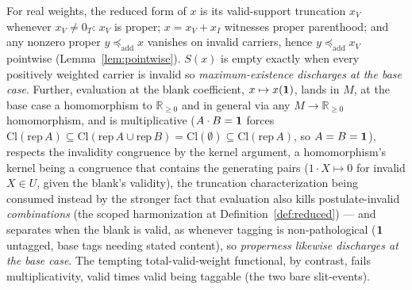 \begin{lemma}[The base case $M = \mathbb{R}_{\geq 0}$]\label{lem:basecase}
For real weights, the reduced form of $x$ is its valid-support truncation $x_V$ whenever $x_V \neq 0_T$: $x_V$ is proper; $x = x_V + x_I$ witnesses proper parenthood; and any nonzero proper $y \preceq_{\mathrm{add}} x$ vanishes on invalid carriers, hence $y \preceq_{\mathrm{add}} x_V$ pointwise (Lemma~\ref{lem:pointwise}). $S(x)$ is empty exactly when every positively weighted carrier is invalid  so \emph{maximum-existence discharges at the base case}. Further, evaluation at the blank coefficient, $x \mapsto x(\mathbf{1})$, lands in $M$, at the base case a homomorphism to $\mathbb{R}_{\geq 0}$ and in general via any $M \to \mathbb{R}_{\geq 0}$ homomorphism, and is multiplicative ($A \cdot B = \mathbf{1}$ forces $\mathrm{Cl}(\mathrm{rep}\,A) \subseteq \mathrm{Cl}(\mathrm{rep}\,A \cup \mathrm{rep}\,B) = \mathrm{Cl}(\emptyset) \subseteq \mathrm{Cl}(\mathrm{rep}\,A)$, so $A = B = \mathbf{1}$), respects the invalidity congruence by the kernel argument, a homomorphism's kernel being a congruence that contains the generating pairs ($1 \cdot X \mapsto 0$ for invalid $X \in U$, given the blank's validity), the truncation characterization being consumed instead by the stronger fact that evaluation also kills postulate-invalid \emph{combinations} (the scoped harmonization at Definition~\ref{def:reduced}) --- and separates when the blank is valid, as whenever tagging is non-pathological ($\mathbf{1}$ untagged, base tags needing stated content), so \emph{properness likewise discharges at the base case}. The tempting total-valid-weight functional, by contrast, fails multiplicativity, valid times valid being taggable (the two bare slit-events).

\end{lemma}
